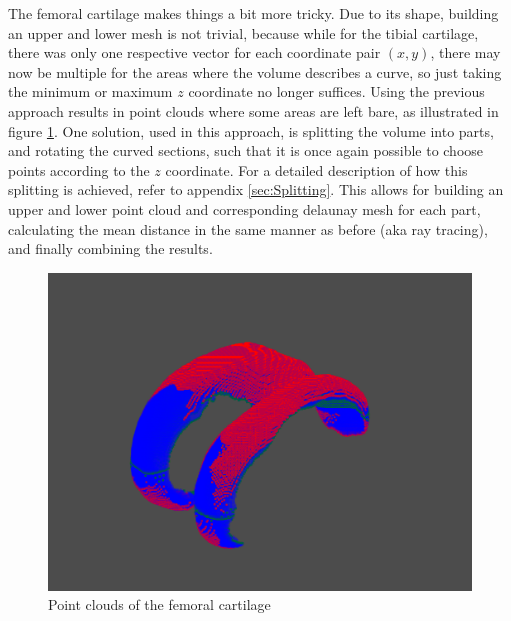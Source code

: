 \par
The femoral cartilage makes things a bit more tricky. Due to its shape, building an upper and lower mesh is not trivial, because while for the tibial cartilage, there was only one respective vector for each coordinate pair $(x, y)$, there may now be multiple for the areas where the volume describes a curve, so just taking the minimum or maximum $z$ coordinate no longer suffices. Using the previous approach results in point clouds where some areas are left bare, as illustrated in figure \ref{fig:femoral_point_cloud}. One solution, used in this approach, is splitting the volume into parts, and rotating the curved sections, such that it is once again possible to choose points according to the $z$ coordinate. For a detailed description of how this splitting is achieved, refer to appendix \ref{sec:Splitting}. This allows for building an upper and lower point cloud and corresponding delaunay mesh for each part, calculating the mean distance in the same manner as before (aka ray tracing), and finally combining the results.
\begin{figure}[htb!]
	\centering
	\includegraphics[width=\linewidth]{./figures/s4}
	\caption{Point clouds of the femoral cartilage}
	\label{fig:femoral_point_cloud}
\end{figure}

